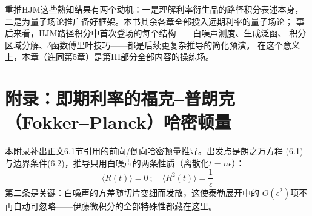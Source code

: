 重推HJM这些熟知结果有两个动机：一是理解利率衍生品的路径积分表述本身，
二是为量子场论推广备好框架。本书其余各章全部投入远期利率的量子场论；
事后来看，HJM路径积分中首次登场的每个结构——白噪声测度、生成泛函、
积分区域分解、$\delta$函数傅里叶技巧——都是后续更复杂推导的简化预演。
在这个意义上，本章（连同第5章）是第III部分全部内容的操练场。

\section{附录：即期利率的福克--普朗克（Fokker--Planck）哈密顿量}

本附录补出正文6.1节引用的前向/倒向哈密顿量推导。出发点是朗之万方程
(6.1)与边界条件(6.2)，推导只用白噪声的两条性质（离散化$t=n\epsilon$）：
\begin{equation*}
\langle R(t)\rangle=0\ ;\quad \langle R^2(t)\rangle=\frac{1}{\epsilon}
\end{equation*}
第二条是关键：白噪声的方差随切片变细而发散，这使泰勒展开中的
$O(\epsilon^2)$项不再自动可忽略——伊藤微积分的全部特殊性都藏在这里。

